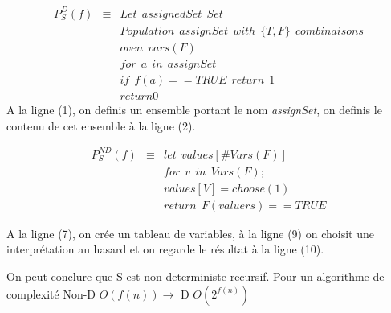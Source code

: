 \subsection{}

\begin{eqnarray}
	P^D_S(f) 	&\equiv& Let \:\: assignedSet \:\: Set\\
				&& Population \:\: assignSet \:\: with \:\: \{T,F\} \:\: combinaisons \\
				&& oven \:\: vars(F) \\
				&& for \:\: a \:\: in \:\: assignSet \\
				&& if \:\: f(a) == TRUE \:\: return \:\: 1 \\
				&& return 0
\end{eqnarray}
A la ligne (1), on definis un ensemble portant le nom \textit{assignSet}, on definis le contenu de cet ensemble à la ligne (2).


\begin{eqnarray}
	P^{ND}_S(f) &\equiv& let \:\: values[\#Vars(F)]  \\
				&& for \:\: v \:\: in \:\: Vars(F); \\
				&& values[V] = choose(1) \\
				&& return \:\: F(valuers) == TRUE
\end{eqnarray}

A la ligne (7), on crée un tableau de variables, à la ligne (9) on choisit une interprétation au hasard et on regarde le résultat à la ligne (10).

On peut conclure que S est non deterministe recursif. Pour un algorithme de complexité Non-D $O(f(n)) \rightarrow$ D $O(2^{f(n)})$

